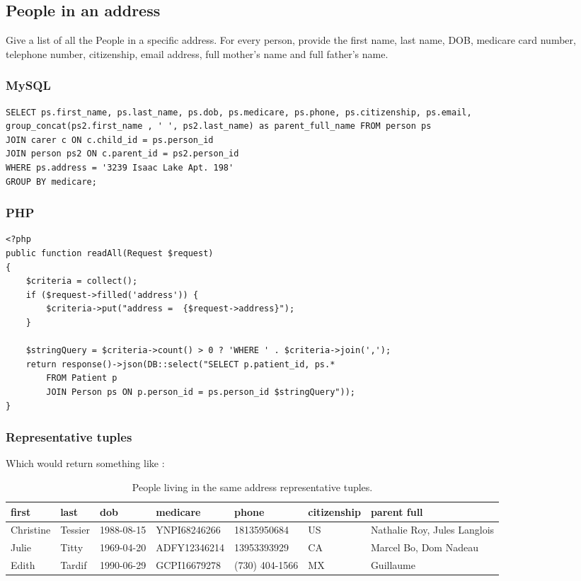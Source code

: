 \documentclass{article}
\begin{document}
\subsection{People in an address}
Give a list of all the People in a specific address. For every person, provide
the first name, last name, DOB, medicare card number, telephone number,
citizenship, email address, full mother’s name and full father’s name.
\subsubsection{MySQL}
\begin{verbatim}
SELECT ps.first_name, ps.last_name, ps.dob, ps.medicare, ps.phone, ps.citizenship, ps.email,
group_concat(ps2.first_name , ' ', ps2.last_name) as parent_full_name FROM person ps
JOIN carer c ON c.child_id = ps.person_id
JOIN person ps2 ON c.parent_id = ps2.person_id
WHERE ps.address = '3239 Isaac Lake Apt. 198'
GROUP BY medicare;
\end{verbatim}

\subsubsection{PHP}
\begin{verbatim}
<?php
public function readAll(Request $request)
{
    $criteria = collect();
    if ($request->filled('address')) {
        $criteria->put("address =  {$request->address}");
    }
    
    $stringQuery = $criteria->count() > 0 ? 'WHERE ' . $criteria->join(',');
    return response()->json(DB::select("SELECT p.patient_id, ps.*
        FROM Patient p
        JOIN Person ps ON p.person_id = ps.person_id $stringQuery"));
}
\end{verbatim}
\subsubsection{Representative tuples}
Which would return something like :
\begin{table}[ht]
\centering
    \begin{tabular}{|l|l|l|l|l|l|l|} 
        \hline
        first & last & dob & medicare & phone & citizenship & parent full \\
        \hline 
        Christine & Tessier & 1988-08-15 & YNPI68246266 & 18135950684 & US & Nathalie Roy, Jules Langlois\\
        Julie & Titty & 1969-04-20 & ADFY12346214 & 13953393929 & CA & Marcel Bo, Dom Nadeau \\
        Edith & Tardif & 1990-06-29 & GCPI16679278 & (730) 404-1566 & MX & Guillaume\\
        \hline
    \end{tabular}
    \caption{People living in the same address representative tuples.}
    \end{table}
\end{document}
